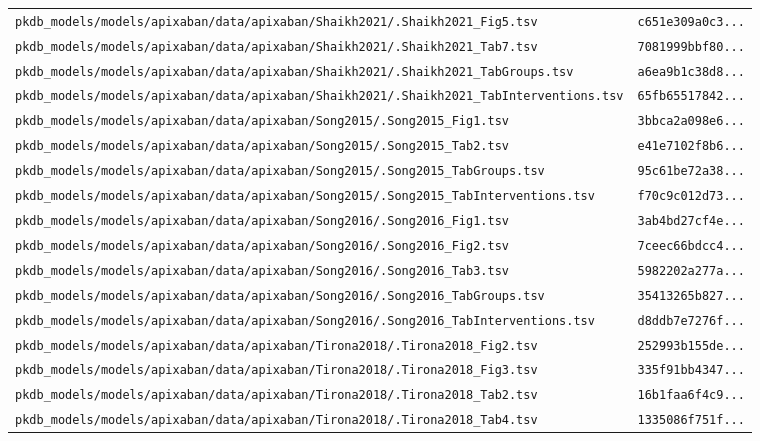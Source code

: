 \begin{longtable}{ll}
\texttt{pkdb\_models/models/apixaban/data/apixaban/Shaikh2021/.Shaikh2021\_Fig5.tsv} & \texttt{c651e309a0c3...} \\
\texttt{pkdb\_models/models/apixaban/data/apixaban/Shaikh2021/.Shaikh2021\_Tab7.tsv} & \texttt{7081999bbf80...} \\
\texttt{pkdb\_models/models/apixaban/data/apixaban/Shaikh2021/.Shaikh2021\_TabGroups.tsv} & \texttt{a6ea9b1c38d8...} \\
\texttt{pkdb\_models/models/apixaban/data/apixaban/Shaikh2021/.Shaikh2021\_TabInterventions.tsv} & \texttt{65fb65517842...} \\
\texttt{pkdb\_models/models/apixaban/data/apixaban/Song2015/.Song2015\_Fig1.tsv} & \texttt{3bbca2a098e6...} \\
\texttt{pkdb\_models/models/apixaban/data/apixaban/Song2015/.Song2015\_Tab2.tsv} & \texttt{e41e7102f8b6...} \\
\texttt{pkdb\_models/models/apixaban/data/apixaban/Song2015/.Song2015\_TabGroups.tsv} & \texttt{95c61be72a38...} \\
\texttt{pkdb\_models/models/apixaban/data/apixaban/Song2015/.Song2015\_TabInterventions.tsv} & \texttt{f70c9c012d73...} \\
\texttt{pkdb\_models/models/apixaban/data/apixaban/Song2016/.Song2016\_Fig1.tsv} & \texttt{3ab4bd27cf4e...} \\
\texttt{pkdb\_models/models/apixaban/data/apixaban/Song2016/.Song2016\_Fig2.tsv} & \texttt{7ceec66bdcc4...} \\
\texttt{pkdb\_models/models/apixaban/data/apixaban/Song2016/.Song2016\_Tab3.tsv} & \texttt{5982202a277a...} \\
\texttt{pkdb\_models/models/apixaban/data/apixaban/Song2016/.Song2016\_TabGroups.tsv} & \texttt{35413265b827...} \\
\texttt{pkdb\_models/models/apixaban/data/apixaban/Song2016/.Song2016\_TabInterventions.tsv} & \texttt{d8ddb7e7276f...} \\
\texttt{pkdb\_models/models/apixaban/data/apixaban/Tirona2018/.Tirona2018\_Fig2.tsv} & \texttt{252993b155de...} \\
\texttt{pkdb\_models/models/apixaban/data/apixaban/Tirona2018/.Tirona2018\_Fig3.tsv} & \texttt{335f91bb4347...} \\
\texttt{pkdb\_models/models/apixaban/data/apixaban/Tirona2018/.Tirona2018\_Tab2.tsv} & \texttt{16b1faa6f4c9...} \\
\texttt{pkdb\_models/models/apixaban/data/apixaban/Tirona2018/.Tirona2018\_Tab4.tsv} & \texttt{1335086f751f...} \\

\end{longtable}
